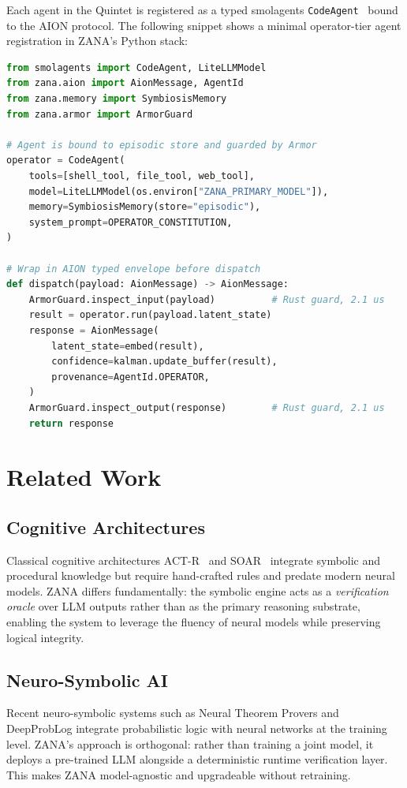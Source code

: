 \documentclass[12pt,a4paper]{article}
\begin{document}
\vspace{0.5em}
\noindent Each agent in the Quintet is registered as a typed smolagents
\texttt{CodeAgent}~\cite{huggingface2024smolagents} bound to the AION protocol. The
following snippet shows a minimal operator-tier agent registration in ZANA's Python stack:

\begin{lstlisting}[language=Python, caption={Registering an Operator-tier agent in ZANA (Python)}]
from smolagents import CodeAgent, LiteLLMModel
from zana.aion import AionMessage, AgentId
from zana.memory import SymbiosisMemory
from zana.armor import ArmorGuard

# Agent is bound to episodic store and guarded by Armor
operator = CodeAgent(
    tools=[shell_tool, file_tool, web_tool],
    model=LiteLLMModel(os.environ["ZANA_PRIMARY_MODEL"]),
    memory=SymbiosisMemory(store="episodic"),
    system_prompt=OPERATOR_CONSTITUTION,
)

# Wrap in AION typed envelope before dispatch
def dispatch(payload: AionMessage) -> AionMessage:
    ArmorGuard.inspect_input(payload)          # Rust guard, 2.1 us
    result = operator.run(payload.latent_state)
    response = AionMessage(
        latent_state=embed(result),
        confidence=kalman.update_buffer(result),
        provenance=AgentId.OPERATOR,
    )
    ArmorGuard.inspect_output(response)        # Rust guard, 2.1 us
    return response
\end{lstlisting}

\section{Related Work}

\subsection{Cognitive Architectures}
Classical cognitive architectures ACT-R~\cite{anderson2004actr} and
SOAR~\cite{laird2012soar} integrate symbolic and procedural knowledge but require
hand-crafted rules and predate modern neural models. ZANA differs fundamentally: the symbolic
engine acts as a \emph{verification oracle} over LLM outputs rather than as the primary
reasoning substrate, enabling the system to leverage the fluency of neural models while
preserving logical integrity.

\subsection{Neuro-Symbolic AI}
Recent neuro-symbolic systems such as Neural Theorem Provers and DeepProbLog integrate
probabilistic logic with neural networks at the training level. ZANA's approach is orthogonal:
rather than training a joint model, it deploys a pre-trained LLM alongside a deterministic
runtime verification layer. This makes ZANA model-agnostic and upgradeable without retraining.
\end{document}
